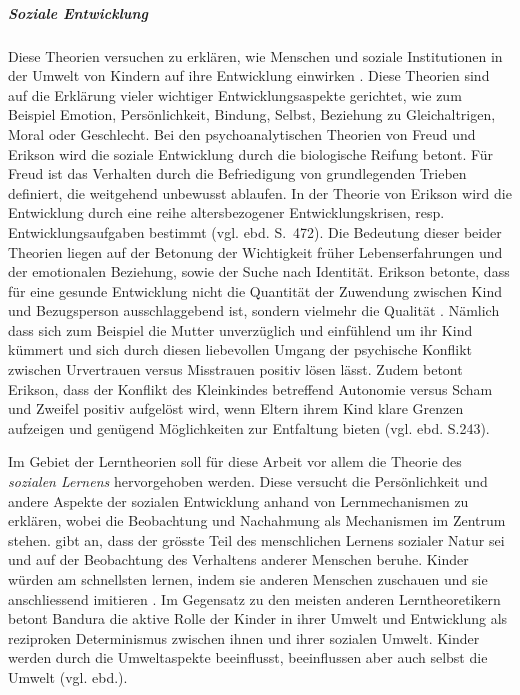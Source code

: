 \subparagraph{Soziale Entwicklung}\label{par:SozialeEntwicklung}
Diese Theorien versuchen zu erklären, wie Menschen und soziale Institutionen in der Umwelt von Kindern auf ihre Entwicklung einwirken \cite[S.~470ff]{Siegler2008}. Diese Theorien sind auf die Erklärung vieler wichtiger Entwicklungsaspekte gerichtet, wie zum Beispiel Emotion, Persönlichkeit, Bindung, Selbst, Beziehung zu Gleichaltrigen, Moral oder Geschlecht. Bei den psychoanalytischen Theorien von Freud und Erikson wird die soziale Entwicklung  durch die biologische Reifung betont. Für Freud ist das Verhalten durch die Befriedigung von grundlegenden Trieben definiert, die weitgehend unbewusst ablaufen. In der Theorie von Erikson wird die Entwicklung durch eine reihe altersbezogener Entwicklungskrisen, resp. Entwicklungsaufgaben bestimmt (vgl. ebd. S.~472). Die Bedeutung dieser beider Theorien liegen auf der Betonung der Wichtigkeit früher Lebenserfahrungen und der emotionalen Beziehung, sowie der Suche nach Identität. Erikson betonte, dass für eine gesunde Entwicklung nicht die Quantität der Zuwendung zwischen Kind und Bezugsperson ausschlaggebend ist, sondern vielmehr die Qualität \cite[S.~243]{Berk2011}. Nämlich dass sich zum Beispiel die Mutter unverzüglich und einfühlend um ihr Kind kümmert und sich durch diesen liebevollen Umgang der psychische Konflikt zwischen Urvertrauen versus Misstrauen positiv lösen lässt. Zudem betont Erikson, dass der Konflikt des Kleinkindes betreffend Autonomie versus Scham und Zweifel positiv aufgelöst wird, wenn Eltern ihrem Kind klare Grenzen aufzeigen und genügend Möglichkeiten zur Entfaltung bieten (vgl. ebd. S.243). 

Im Gebiet der Lerntheorien soll für diese Arbeit vor allem die Theorie des \textit{sozialen Lernens} hervorgehoben werden. Diese versucht die Persönlichkeit und andere Aspekte der sozialen Entwicklung anhand von Lernmechanismen zu erklären, wobei die Beobachtung und Nachahmung als Mechanismen im Zentrum stehen.  gibt an, dass der grösste Teil des menschlichen Lernens sozialer Natur sei und auf der Beobachtung des Verhaltens anderer Menschen beruhe. Kinder würden am schnellsten lernen, indem sie anderen Menschen zuschauen und sie anschliessend imitieren \cite[S.~482ff]{Siegler2008}. Im Gegensatz zu den meisten anderen Lerntheoretikern betont Bandura die aktive Rolle der Kinder in ihrer Umwelt und Entwicklung als reziproken Determinismus zwischen ihnen und ihrer sozialen Umwelt. Kinder werden durch die Umweltaspekte beeinflusst, beeinflussen aber auch selbst die Umwelt (vgl. ebd.). 

